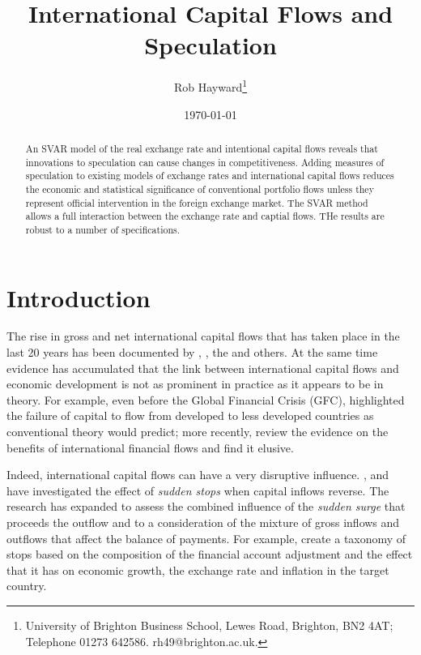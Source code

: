 \documentclass[12pt, a4paper, oneside]{article}\usepackage[]{graphicx}\usepackage[]{color}
\begin{document}
\title{International Capital Flows and Speculation}
\author{Rob Hayward\footnote{University of Brighton Business School, Lewes Road, Brighton, BN2 4AT; Telephone 01273 642586.  rh49@brighton.ac.uk. }} 
\date{\today}
\maketitle
  \begin{abstract}An SVAR model of the real exchange rate and intentional capital flows reveals that innovations to speculation can cause changes in competitiveness.  Adding measures of speculation to existing models of exchange rates and international capital flows reduces the economic and statistical significance of conventional portfolio flows unless they represent official intervention in the foreign exchange market.   The SVAR method allows a full interaction between the exchange rate and captial flows.  THe results are robust to a number of specifications.  
\end{abstract}

\section{Introduction} 
The rise in gross and net international capital flows that has taken place in the last 20 years has been documented by \citet{PLane2007}, \citet{obstfeldtaylor}, the \citet{BISFX2013} and others. At the same time evidence has accumulated that the link between international capital flows and economic development is not as prominent in practice as it appears to be in theory.  For example, even before the Global Financial Crisis (GFC), \citet{MishkinFinInstab} highlighted the failure of capital to flow from developed to less developed countries as conventional theory would predict; more recently, \citet{HauEquity} review the evidence on the benefits of international financial flows and find it elusive.  

Indeed, international capital flows can have a very disruptive influence.   \citet{CalvoSS},\citet{DornbuschSS} and \citet{KrugmanSS} have investigated the effect of \emph{sudden stops} when capital inflows reverse. The research has expanded to assess the combined influence of the \emph{sudden surge} that proceeds the outflow and to a consideration of the mixture of gross inflows and outflows that affect the balance of payments.  For example, \citet{cavalloSS} create a taxonomy of stops based on the composition of the financial account adjustment and the effect that it has on economic growth, the exchange rate and inflation in the target country.   
\end{document}
